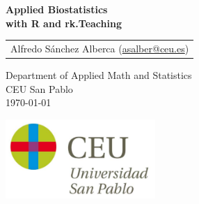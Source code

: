 \begin{titlepage}
\thispagestyle{empty}
\vspace*{7cm}
\par

\begin{center}
\normalfont\fontsize{30}{30}\selectfont
{\bfseries \color{blueceu}Applied Biostatistics\\ with R and rk.Teaching}
\end{center}
\vspace{1cm}

\begin{center}
\Large
\begin{tabular}{c}
Alfredo S\'anchez Alberca (\href{mailto:asalber@ceu.es}{asalber@ceu.es})
\end{tabular}

\medskip 
Department of Applied Math and Statistics\\ CEU San Pablo\\[1cm]
\medskip 
\today

\vspace{1cm}
\includegraphics[height=3cm]{img/logo_uspceu}
\end{center}
\vfill
\end{titlepage}